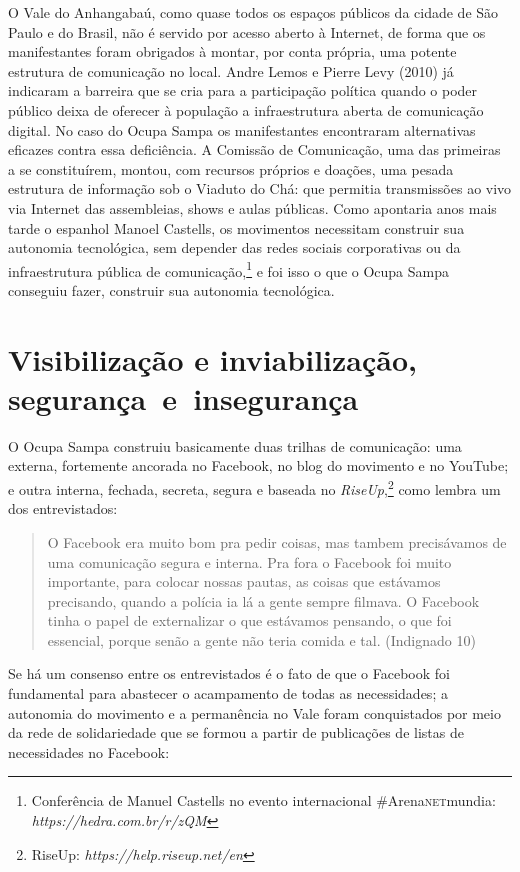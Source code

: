 O Vale do Anhangabaú, como quase todos os espaços públicos da cidade de
São Paulo e do Brasil, não é servido por acesso aberto à Internet, de
forma que os manifestantes foram obrigados à montar, por conta própria,
uma potente estrutura de comunicação no local. Andre Lemos e Pierre Levy
(2010) já indicaram a barreira que se cria para a participação política
quando o poder público deixa de oferecer à população a infraestrutura
aberta de comunicação digital. No caso do Ocupa Sampa os manifestantes
encontraram alternativas eficazes contra essa deficiência. A Comissão de
Comunicação, uma das primeiras a se constituírem, montou, com recursos
próprios e doações, uma pesada estrutura de informação sob o Viaduto do
Chá: que permitia transmissões ao vivo via Internet das assembleias,
shows e aulas públicas. Como apontaria anos mais tarde o espanhol Manoel
Castells, os movimentos necessitam construir sua autonomia tecnológica,
sem depender das redes sociais corporativas ou da infraestrutura pública
de comunicação,\footnote{Conferência de Manuel Castells no evento
  internacional \#Arena\textsc{net}mundia:
  \emph{https://hedra.com.br/r/zQM}}
e foi isso o que o Ocupa Sampa conseguiu fazer, construir sua autonomia
tecnológica.

\section{Visibilização e inviabilização, segurança~e~insegurança}

\noindent{}O Ocupa Sampa construiu basicamente duas trilhas de comunicação: uma
externa, fortemente ancorada no Facebook, no blog do movimento e no
YouTube; e outra interna, fechada, secreta, segura e baseada no
\emph{RiseUp},\footnote{RiseUp: \emph{https://help.riseup.net/en}} como
lembra um dos entrevistados:

\begin{quote}
O Facebook era muito bom pra pedir coisas, mas tambem precisávamos de
uma comunicação segura e interna. Pra fora o Facebook foi muito
importante, para colocar nossas pautas, as coisas que estávamos
precisando, quando a polícia ia lá a gente sempre filmava. O Facebook
tinha o papel de externalizar o que estávamos pensando, o que foi
essencial, porque senão a gente não teria comida e tal. (Indignado 10)
\end{quote}

Se há um consenso entre os entrevistados é o fato de que o
Facebook foi fundamental para abastecer o acampamento de todas as
necessidades; a autonomia do movimento e a permanência no Vale foram
conquistados por meio da rede de solidariedade que se formou a partir de
publicações de listas de necessidades no Facebook:

